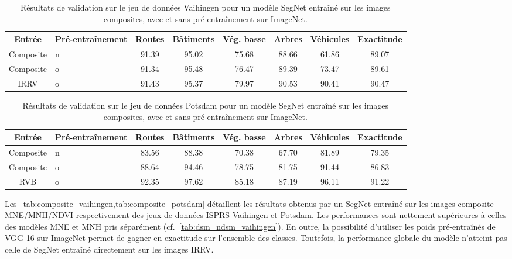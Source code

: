 

\begin{table}[h]
  \begin{tabularx}{\textwidth}{c Y c c c c c c}
    \toprule
    Entrée & Pré-entraînement & Routes & Bâtiments & Vég. basse & Arbres & Véhicules & Exactitude\\
    \midrule
    Composite & n & 91.39 & 95.02 & 75.68 & 88.66 & 61.86 & 89.07\\
    Composite & o & 91.34 & 95.48 & 76.47 & 89.39 & 73.47 & 89.61\\
    \gls{IRRV}& o & 91.43 & 95.37 & 79.97 & 90.53 & 90.41 & 90.47\\
    \bottomrule
  \end{tabularx}
  \caption{Résultats de validation sur le jeu de données  Vaihingen pour un modèle SegNet entraîné sur les images composites, avec et sans pré-entraînement sur ImageNet.}
  \label{tab:composite_vaihingen}
\end{table}

\begin{table}[h]
  \begin{tabularx}{\textwidth}{c Y c c c c c c}
    \toprule
    Entrée & Pré-entraînement & Routes & Bâtiments & Vég. basse & Arbres & Véhicules & Exactitude\\
    \midrule
    Composite & n & 83.56 & 88.38 & 70.38 & 67.70 & 81.89 & 79.35\\
    Composite & o & 88.64 & 94.46 & 78.75 & 81.75 & 91.44 & 86.83\\
    \gls{RVB} & o & 92.35 & 97.62 & 85.18 & 87.19 & 96.11 & 91.22\\
    \bottomrule
  \end{tabularx}
  \caption{Résultats de validation sur le jeu de données  Potsdam pour un modèle SegNet entraîné sur les images composites, avec et sans pré-entraînement sur ImageNet.}
  \label{tab:composite_potsdam}
\end{table}

Les~\cref{tab:composite_vaihingen,tab:composite_potsdam} détaillent les résultats obtenus par un SegNet entraîné sur les images composite \gls{MNE}/\gls{MNH}/\gls{NDVI} respectivement des jeux de données ISPRS Vaihingen et Potsdam. Les performances sont nettement supérieures à celles des modèles \gls{MNE} et \gls{MNH} pris séparément (cf.~\cref{tab:dsm_ndsm_vaihingen}). En outre, la possibilité d'utiliser les poids pré-entraînés de VGG-16 sur ImageNet permet de gagner en exactitude sur l'ensemble des classes. Toutefois, la performance globale du modèle n'atteint pas celle de SegNet entraîné directement sur les images \gls{IRRV}.

